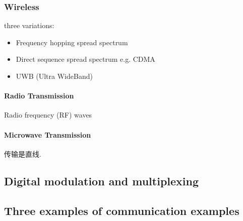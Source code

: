 \subsubsection{Wireless}
three variations:
\begin{itemize}
    \item Frequency hopping spread spectrum
    \item Direct sequence spread spectrum e.g. CDMA
    \item UWB (Ultra WideBand)
\end{itemize}

\paragraph{Radio Transmission} Radio frequency (RF) waves 

\paragraph{Microwave Transmission} 传输是直线. 

\subsection{Digital modulation and multiplexing}
\subsection{Three examples of communication examples}